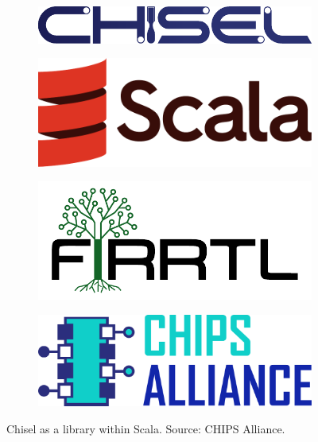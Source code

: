 \begin{figure}[htbp]
    \centering
    \begin{subfigure}[b]{0.3\textwidth}
        \centering
        \includegraphics[width=\linewidth]{Images/Chisel_logo.pdf}
    \end{subfigure}%
    \hfill
    \begin{subfigure}[b]{0.18\textwidth}
        \centering
        \includegraphics[width=\linewidth]{Images/Chisel_Scala_Logo.pdf}
    \end{subfigure}%
    \hfill
    \begin{subfigure}[b]{0.18\textwidth}
        \centering
        \includegraphics[width=\linewidth]{Images/Chisel_FIRRTL.pdf}
    \end{subfigure}%
    \hfill
    \begin{subfigure}[b]{0.2\textwidth}
        \centering
        \includegraphics[width=\linewidth]{Images/Chisel_ChipsAlliance.pdf}
    \end{subfigure}
    \caption{Chisel as a library within Scala. Source: CHIPS Alliance.}
    \label{fig:chisel_ecosystem_logos}
\end{figure}

